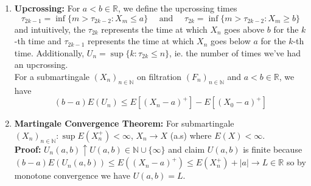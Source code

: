 \documentclass{article}
\begin{document}
\begin{enumerate}
    \item \textbf{Upcrossing:} For \(a < b \in \mathbb{R}\), we define the upcrossing times
    \[
    \tau_{2k - 1} = \inf \{m > \tau_{2k -2}: X_m \leq a\} \quad \text{ and } \quad \tau_{2k} = \inf \{m > \tau_{2k -2}: X_m \geq b\}
    \]
    and intuitively, the \(\tau_{2k}\) represents the time at which \(X_n\) goes above \(b\) for the \(k\)-th time and \(\tau_{2k - 1}\) represents the time at which \(X_n\) goes below \(a\) for the \(k\)-th time. Additionally, \(U_n = \sup\{k: \tau_{2k} \leq n\}\), ie. the number of times we've had an upcrossing.\\

    For a submartingale \((X_n)_{n\in \mathbb{N}}\) on filtration \((F_n)_{n\in \mathbb{N}}\) and \(a < b \in \mathbb{R}\), we have
    \[
    (b-a)E(U_n) \leq E[(X_n-a)^+] - E[(X_0-a)^+]
    \]
    \item \textbf{Martingale Convergence Theorem:} For submartingale \((X_n)_{n \in \mathbb{N}}:\sup E(X^+_n) < \infty\), \(X_n \to X\) (a.s) where \(E(X) < \infty\).\\

    \textbf{Proof:} \(U_n(a,b) \uparrow U(a,b) \in \mathbb{N} \cup \{\infty\}\) and claim \(U(a,b)\) is finite because \((b-a)E(U_n(a,b)) \leq E((X_n-a)^+)\leq E(X_n^+) + |a| \to L \in \mathbb{R}\) so by monotone convergence we have \(U(a,b)=L\). 
\end{enumerate}
\end{document}
